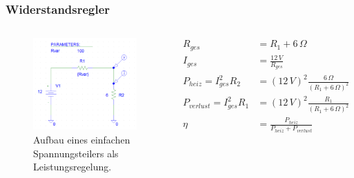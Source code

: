 \documentclass{beamer}
\begin{document}
	\begin{frame}
		\frametitle{Widerstandsregler}
		\begin{columns}
			\begin{figure}[tbh]
				\centering
				\includegraphics[width=1\linewidth]{medien/V1-0.png}
				\caption[Erster Aufbau]{Aufbau eines einfachen Spannungsteilers als Leistungsregelung.}
			\end{figure}
			\begin{align*}
				R_{ges}&=R_1+6\,\Omega \\
				I_{ges}&=\frac{12\, V}{R_{ges}} \\
				P_{heiz}=I_{ges}^2R_2&=(12\, V)^2\frac{6\,\Omega}{\left( R_1 + 6\,\Omega\right) ^2} \\
				P_{verlust}=I_{ges}^2R_1&=(12\, V)^2\frac{R_1}{\left( R_1 + 6\,\Omega\right) ^2} \\
				\eta &= \frac{P_{heiz}}{P_{heiz}+P_{verlust}}
			\end{align*}
		\end{columns}
	\end{frame}
\end{document}
